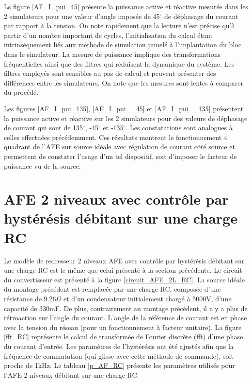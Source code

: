 Ls figure \ref{AF_I_pui_45} présente la puissance active et réactive mesurée dans les 2 simulateurs pour une valeur d'angle imposée de 45$^\circ$ de déphasage du courant par rapport à la tension. On note rapidement que la lecture n'est précise qu'à partir d'un nombre important de cycles, l'initialisation du calcul étant intrinsèquement liés aux méthode de simulation jumelé à l'implantation du bloc dans le simulateur. La mesure de puissance implique des transformations fréquentielles ainsi que des filtres qui réduisent la dynamique du système. Les filtres employés sont sensibles au pas de calcul et peuvent présenter des différences entre les simulateurs. On note que les mesures sont lentes à comparer du procédé.

Les figures \ref{AF_I_pui_135}, \ref{AF_I_pui__45} et \ref{AF_I_pui__135} présentent la puissance active et réactive sur les 2 simulateurs pour des valeurs de déphasage de courant qui sont de 135$^\circ$, -45$^\circ$ et -135$^\circ$. Les constatations sont analogues à celles effectuées précédemment. Ces résultats montrent le fonctionnement 4 quadrant de l'AFE sur source idéale avec régulation de courant côté source et permettent de constater l'usage d'un tel dispositif, soit d'imposer le facteur de puissance vu de la source. 
\section{AFE 2 niveaux avec contrôle par hystérésis débitant sur une charge RC}
Le modèle de redresseur 2 niveaux AFE avec contrôle par hystérésis débitant sur une charge RC est le même que celui présenté à la section précédente. Le circuit du convertisseur est présenté à la figure \ref{circuit_AFE_2L_RC}. La source idéale du montage précédent est remplacée par une charge RC, composée d'une résistance de 9.26$\Omega$ et d'un condensateur initialement chargé à 5000V, d'une capacité de 330mF. De plus, contrairement au montage précédent, il n'y a plus de rétroaction sur l'angle du courant. L'angle de la référence de courant est en phase avec la tension du réseau (pour un fonctionnement à facteur unitaire). La figure \ref{fft_RC} représente le calcul de transformée de Fourier discrète (fft) d'une phase du courant d'entrée. Les paramètres de l'hystérésis ont été ajustés afin que la fréquence de commutation (qui glisse avec cette méthode de commande), soit proche de 1kHz. Le tableau \ref{p_AF_RC} présente les paramètres utilisés pour l'AFE 2 niveaux débitant sur une charge RC.

